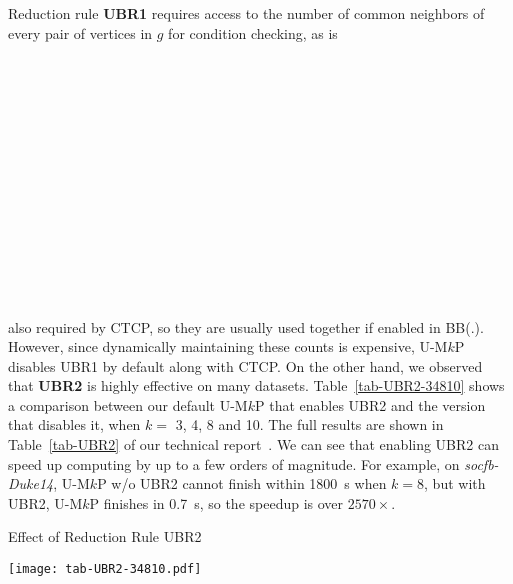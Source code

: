 \documentclass[sigconf, nonacm]{acmart}
\begin{document}
Reduction rule \textbf{UBR1} requires access to the number of common neighbors of every pair of vertices in $g$ for condition checking, as is\\
\\
\\
\\
\\
\\
\\
\\
\\
\\
\\
\\
\\
\\
\\
also required by CTCP, so they are usually used together if enabled in BB(.). However, since dynamically maintaining these counts is expensive, U-M$k$P disables UBR1 by default along with CTCP. 
On the other hand, we observed that \textbf{UBR2} is highly effective on many datasets. 
Table~\ref{tab-UBR2-34810} shows a comparison between our default U-M$k$P that enables UBR2 and the version that disables it, when $k=$ 3, 4, 8 and 10. The full results are shown in Table~\ref{tab-UBR2} of our technical report~\cite{tech_report}. We can see that enabling UBR2 can speed up computing by up to a few orders of magnitude. For example, on \textit{socfb-Duke14}, U-M$k$P w/o UBR2 cannot finish within 1800~s when $k=8$, but with UBR2, U-M$k$P finishes in 0.7~s, so the speedup is over $2570\times$.

\begin{table}[t]
  \caption{Effect of Reduction Rule UBR2}\label{tab-UBR2-34810}
  \vspace{-3.5mm}
  \texttt{[image: tab-UBR2-34810.pdf]}
\end{table}
\end{document}
